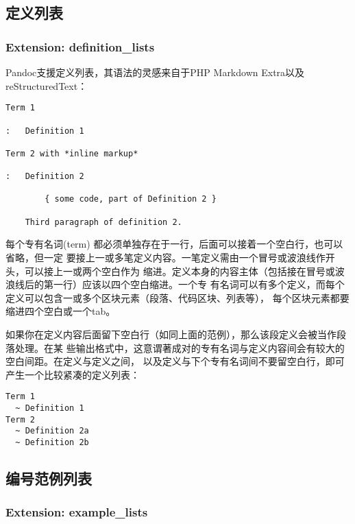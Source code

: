 \documentclass[cn]{elegantbook}
\begin{document}
\hypertarget{ux5b9aux4e49ux5217ux8868}{%
\subsection{定义列表}\label{ux5b9aux4e49ux5217ux8868}}

\hypertarget{extension-definition_lists}{%
\subsubsection{Extension:
definition\_lists}\label{extension-definition_lists}}

Pandoc支援定义列表，其语法的灵感来自于PHP Markdown
Extra以及reStructuredText：

\begin{lstlisting}
Term 1

:   Definition 1

Term 2 with *inline markup*

:   Definition 2

        { some code, part of Definition 2 }

    Third paragraph of definition 2.
\end{lstlisting}

每个专有名词(term)
都必须单独存在于一行，后面可以接着一个空白行，也可以省略，但一定
要接上一或多笔定义内容。一笔定义需由一个冒号或波浪线作开头，可以接上一或两个空白作为
缩进。定义本身的内容主体（包括接在冒号或波浪线后的第一行）应该以四个空白缩进。一个专
有名词可以有多个定义，而每个定义可以包含一或多个区块元素（段落、代码区块、列表等），
每个区块元素都要缩进四个空白或一个tab。

如果你在定义内容后面留下空白行（如同上面的范例），那么该段定义会被当作段落处理。在某
些输出格式中，这意谓著成对的专有名词与定义内容间会有较大的空白间距。在定义与定义之间，
以及定义与下个专有名词间不要留空白行，即可产生一个比较紧凑的定义列表：

\begin{lstlisting}
Term 1
  ~ Definition 1
Term 2
  ~ Definition 2a
  ~ Definition 2b
\end{lstlisting}

\hypertarget{ux7f16ux53f7ux8303ux4f8bux5217ux8868}{%
\subsection{编号范例列表}\label{ux7f16ux53f7ux8303ux4f8bux5217ux8868}}

\hypertarget{extension-example_lists}{%
\subsubsection{Extension:
example\_lists}\label{extension-example_lists}}
\end{document}
